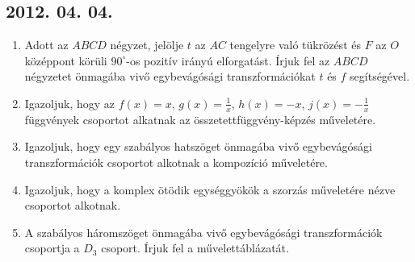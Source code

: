 \subsection*{2012. 04. 04.}
\begin{enumerate}
\item Adott az $ABCD$ négyzet, jelölje $t$ az $AC$ tengelyre való tükrözést és $F$ az $O$ középpont körüli $90^\circ$-os pozitív irányú elforgatást. Írjuk fel az $ABCD$ négyzetet önmagába vivő egybevágósági transzformációkat $t$ és $f$ segítségével.
\item Igazoljuk, hogy az $f(x)=x$, $g(x)=\frac{1}{x}$, $h(x)=-x$, $j(x)=-\frac{1}{x}$ függvények csoportot alkatnak az összetettfüggvény-képzés műveletére.
\item Igazoljuk, hogy egy szabályos hatszöget önmagába vivő egybevágósági transzformációk csoportot alkotnak a kompozíció műveletére.
\item Igazoljuk, hogy a komplex ötödik egységgyökök a szorzás műveletére nézve csoportot alkotnak.
\item A szabályos háromszöget önmagába vivő egybevágósági transzformációk csoportja a $D_3$ csoport. Írjuk fel a művelettáblázatát.
\end{enumerate}

